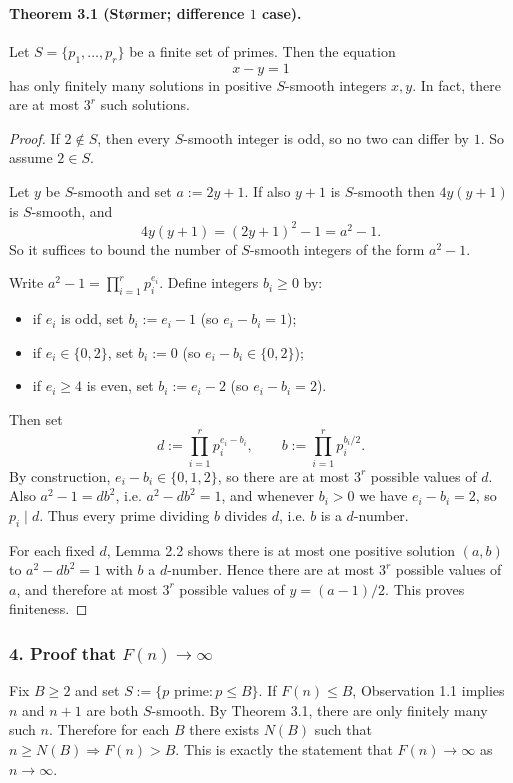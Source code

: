 \paragraph{Theorem 3.1 (St\o rmer; difference $1$ case).}
Let $S=\{p_1,\dots,p_r\}$ be a finite set of primes.
Then the equation
\[
 x-y=1
\]
has only finitely many solutions in positive $S$-smooth integers $x,y$.
In fact, there are at most $3^r$ such solutions.
\begin{proof}
If $2\notin S$, then every $S$-smooth integer is odd, so no two can differ by $1$.
So assume $2\in S$.

Let $y$ be $S$-smooth and set $a:=2y+1$.
If also $y+1$ is $S$-smooth then $4y(y+1)$ is $S$-smooth, and
\[
4y(y+1)=(2y+1)^2-1=a^2-1.
\]
So it suffices to bound the number of $S$-smooth integers of the form $a^2-1$.

Write $a^2-1=\prod_{i=1}^r p_i^{e_i}$.
Define integers $b_i\ge 0$ by:
\begin{itemize}
\item if $e_i$ is odd, set $b_i:=e_i-1$ (so $e_i-b_i=1$);
\item if $e_i\in\{0,2\}$, set $b_i:=0$ (so $e_i-b_i\in\{0,2\}$);
\item if $e_i\ge 4$ is even, set $b_i:=e_i-2$ (so $e_i-b_i=2$).
\end{itemize}
Then set
\[
 d:=\prod_{i=1}^r p_i^{e_i-b_i},\qquad b:=\prod_{i=1}^r p_i^{b_i/2}.
\]
By construction, $e_i-b_i\in\{0,1,2\}$, so there are at most $3^r$ possible values of $d$.
Also $a^2-1=db^2$, i.e. $a^2-d b^2=1$, and whenever $b_i>0$ we have $e_i-b_i=2$, so $p_i\mid d$.
Thus every prime dividing $b$ divides $d$, i.e. $b$ is a $d$-number.

For each fixed $d$, Lemma 2.2 shows there is at most one positive solution $(a,b)$ to $a^2-d b^2=1$ with $b$ a $d$-number.
Hence there are at most $3^r$ possible values of $a$, and therefore at most $3^r$ possible values of $y=(a-1)/2$.
This proves finiteness.
\end{proof}

\subsubsection*{4. Proof that $F(n)\to\infty$}
Fix $B\ge 2$ and set $S:=\{p\text{ prime}:p\le B\}$.
If $F(n)\le B$, Observation 1.1 implies $n$ and $n+1$ are both $S$-smooth.
By Theorem 3.1, there are only finitely many such $n$.
Therefore for each $B$ there exists $N(B)$ such that $n\ge N(B)\Rightarrow F(n)>B$.
This is exactly the statement that $F(n)\to\infty$ as $n\to\infty$.

